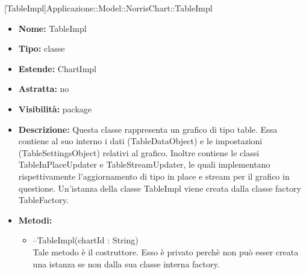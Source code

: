 			
			[TableImpl]{Applicazione::Model::NorrisChart::TableImpl}
			

	
			
			\begin{itemize}
			\item \textbf{Nome:} TableImpl
			\item \textbf{Tipo:} classe
			
		\item \textbf{Estende:}
		ChartImpl
		\item \textbf{Astratta:}
		no
			\item \textbf{Visibilità:} package
			\item \textbf{Descrizione:} Questa classe rappresenta un grafico di tipo table. Essa contiene al suo interno i dati (TableDataObject) e le impostazioni (TableSettingsObject) relativi al grafico. Inoltre contiene le classi TableInPlaceUpdater e TableStreamUpdater, le quali implementano rispettivamente l'aggiornamento di tipo in place e stream per il grafico in questione. Un'istanza della classe TableImpl viene creata dalla classe factory TableFactory.
			\item \textbf{Metodi:}
				\begin{itemize}
				\setlength{\itemsep}{5pt}
				
					\item[\ding{111}] {{--TableImpl(chartId : String)}} \\ [1mm] Tale metodo è il costruttore. Esso è privato perchè non può esser creata una istanza se non dalla sua classe interna factory.
				\end{itemize}
		
			\end{itemize}

